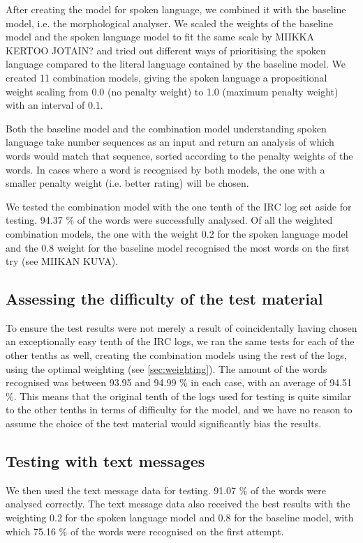 \documentclass[a4paper,conference]{IEEEtran}
\begin{document}
After creating the model for spoken language, we combined it with the baseline model, i.e. the morphological analyser. We scaled the weights of the baseline model and the spoken language model to fit the same scale by MIIKKA KERTOO JOTAIN? and tried out different ways of prioritising the spoken language compared to the literal language contained by the baseline model. We created 11 combination models, giving the spoken language a propositional weight scaling from 0.0 (no penalty weight) to 1.0 (maximum penalty weight) with an interval of 0.1. 

Both the baseline model and the combination model understanding spoken language take number sequences as an input and return an analysis of which words would match that sequence, sorted according to the penalty weights of the words. In cases where a word is recognised by both models, the one with a smaller penalty weight (i.e. better rating) will be chosen.

We tested the combination model with the one tenth of the IRC log set aside for testing. 94.37 \% of the words were successfully analysed. Of all the weighted combination models, the one with the weight 0.2 for the spoken language model and the 0.8 weight for the baseline model recognised the most words on the first try (see MIIKAN KUVA).

\subsection{Assessing the difficulty of the test material}
\label{sec:difficulty}
To ensure the test results were not merely a result of coincidentally having chosen an exceptionally easy tenth of the IRC logs, we ran the same tests for each of the other tenths as well, creating the combination models using the rest of the logs, using the optimal weighting (see \ref{sec:weighting}). The amount of the words recognised was between 93.95 and 94.99 \% in each case, with an average of 94.51 \%. This means that the original tenth of the logs used for testing is quite similar to the other tenths in terms of difficulty for the model, and we have no reason to assume the choice of the test material would significantly bias the results.

\subsection{Testing with text messages}
 
We then used the text message data for testing. 91.07 \% of the words were analysed correctly. The text message data also received the best results with the weighting 0.2 for the spoken language model and 0.8 for the baseline model, with which 75.16 \% of the words were recognised on the first attempt.
\end{document}
